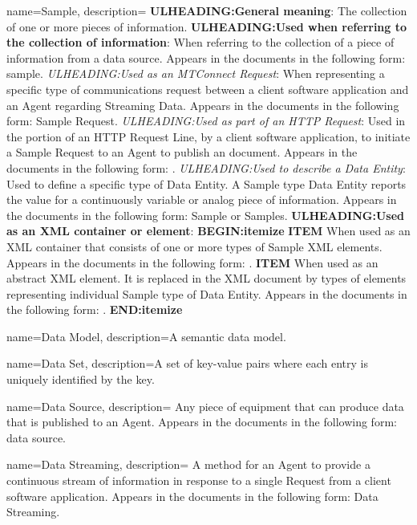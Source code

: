 {
    name={Sample},
	description={
	\textbf{ULHEADING:General meaning}:
	The collection of one or more pieces of information.  
	\textbf{ULHEADING:Used when referring to the collection of information}:
	When referring to the collection of a piece of information from a data source.
	Appears in the documents in the following form: sample.
	\textit{ULHEADING:Used as an \gls{MTConnect Request}}:
	When representing a specific type of communications request between a client software application and an \gls{Agent} regarding \gls{Streaming Data}.  
	Appears in the documents in the following form: \gls{Sample Request}.
	\textit{ULHEADING:Used as part of an \gls{HTTP Request}}:
	Used in the  portion of an \gls{HTTP Request Line}, by a client software application, to initiate a \gls{Sample Request} to an \gls{Agent} to publish an  document.
	Appears in the documents in the following form: .
	\textit{ULHEADING:Used to describe a \gls{Data Entity}}:
	Used to define a specific type of \gls{Data Entity}.  A \gls{Sample} type \gls{Data Entity} reports the value for a continuously variable or analog piece of information.
	Appears in the documents in the following form: \gls{Sample} or \gls{Samples}.
	\textbf{ULHEADING:Used as an XML container or element}:
    \textbf{BEGIN:itemize}
	\textbf{ITEM} When used as an XML container that consists of one or more types of Sample XML elements.
	Appears in the documents in the following form: .
	\textbf{ITEM} When used as an abstract XML element.  It is replaced in the XML document by types of  elements representing individual \gls{Sample} type of \gls{Data Entity}.
	Appears in the documents in the following form: .
    \textbf{END:itemize}
}
}

{
    name={Data Model},
	description={A \gls{semantic data model}.}
}

{
    name={Data Set},
	description={A set of \glspl{key-value pair} where each entry is uniquely identified by the \gls{key}.}
}

{
    name={Data Source},
	description={
	Any piece of equipment that can produce data that is published to an \gls{Agent}.
	Appears in the documents in the following form: data source.
}
}

{
    name={Data Streaming},
	description={
	A method for an \gls{Agent} to provide a continuous stream of information in response to a single \gls{Request} from a client software application.
	Appears in the documents in the following form: \gls{Data Streaming}.
}
}

